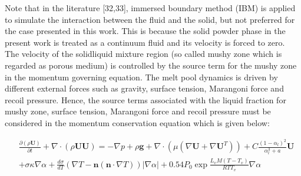 \documentclass[10pt]{article}
\begin{document}
Note that in the literature [32,33], immersed boundary method (IBM) is applied to simulate the interaction between the fluid and the solid, but not preferred for the case presented in this work. This is because the solid powder phase in the present work is treated as a continuum fluid and its velocity is forced to zero. The velocity of the solidliquid mixture region (so called mushy zone which is regarded as porous medium) is controlled by the source term for the mushy zone in the momentum governing equation. The melt pool dynamics is driven by different external forces such as gravity, surface tension, Marangoni force and recoil pressure. Hence, the source terms associated with the liquid fraction for mushy zone, surface tension, Marangoni force and recoil pressure must be considered in the momentum conservation equation which is given below:


\begin{align*}
& \frac{\partial(\rho \mathbf{U})}{\partial t}+\nabla \cdot(\rho \mathbf{U U})=-\nabla p+\rho \mathbf{g}+\nabla \cdot\left(\mu\left(\nabla \mathbf{U}+\nabla \mathbf{U}^{T}\right)\right)+C \frac{\left(1-\alpha_{l}\right)^{2}}{\alpha_{l}^{3}+a} \mathbf{U} \\
& +\sigma \kappa \nabla \alpha+\frac{d \sigma}{d T}(\nabla T-\boldsymbol{n}(\boldsymbol{n} \cdot \nabla T))|\nabla \alpha|+0.54 P_{0} \exp \frac{L_{v} M\left(T-T_{v}\right)}{R T T_{v}} \nabla \alpha \tag{9}
\end{align*}
\end{document}
